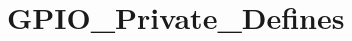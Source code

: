 \hypertarget{group___g_p_i_o___private___defines}{\section{G\-P\-I\-O\-\_\-\-Private\-\_\-\-Defines}
\label{group___g_p_i_o___private___defines}
}
